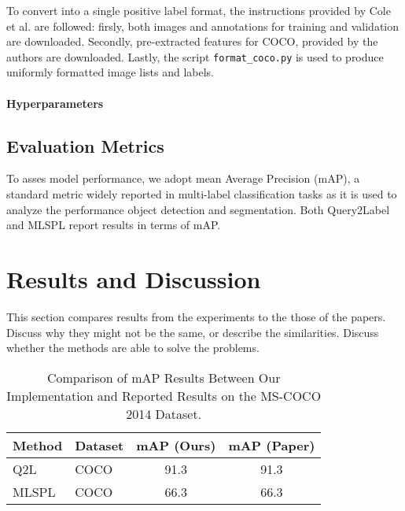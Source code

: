 \documentclass[lettersize,journal]{IEEEtran}
\begin{document}
\vspace{1em}

To convert into a single positive label format, the instructions provided by Cole et al. are followed: firsly, both images and annotations for training and validation are downloaded. Secondly, pre-extracted features for COCO, provided by the authors are downloaded. Lastly, the script \texttt{format\_coco.py} is used to produce uniformly formatted image lists and labels.

\vspace{1em}

\paragraph{Hyperparameters}

\subsection{Evaluation Metrics}
To asses model performance, we adopt mean Average Precision (mAP), a standard metric widely reported in multi-label classification tasks as it is used to analyze the performance object detection and segmentation. Both Query2Label and MLSPL report results in terms of mAP. 


\section{Results and Discussion}
This section compares results from the experiments to the those of the papers. Discuss why they might not be the same, or describe the similarities. Discuss whether the methods are able to solve the problems.

\begin{table}[!t]
    \caption{Comparison of mAP Results Between Our Implementation and Reported Results on the MS-COCO 2014 Dataset.}
    \label{tab:map_comparison}
    \centering
    \begin{tabular}{l l c c}
    \toprule
    \textbf{Method} & \textbf{Dataset} & \textbf{mAP (Ours)} & \textbf{mAP (Paper)} \\
    \midrule
    Q2L  & COCO & 91.3 & 91.3 \\
    MLSPL & COCO & 66.3 & 66.3 \\
    \bottomrule
    \end{tabular}
\end{table}
\end{document}
